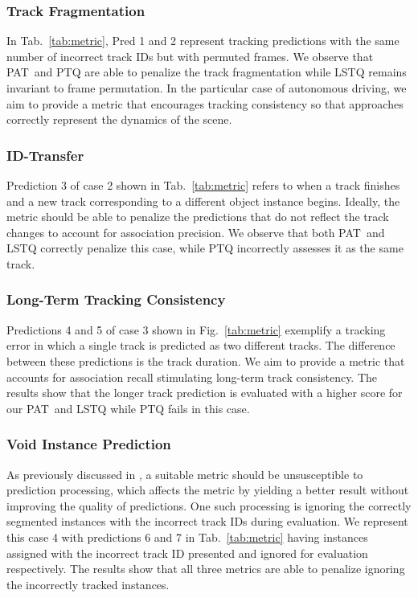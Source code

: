 \documentclass[letterpaper, 10 pt, journal, twoside]{IEEEtran}
\newcommand{\figref}[1]{Fig.~\ref{#1}}
\newcommand{\tabref}[1]{Tab.~\ref{#1}}
\newcommand{\newmet}{PAT}
\begin{document}
\subsubsection{Track Fragmentation}

In \tabref{tab:metric}, Pred 1 and 2 represent tracking predictions with the same number of incorrect track IDs but with permuted frames. We observe that \newmet~and PTQ are able to penalize the track fragmentation while LSTQ remains invariant to frame permutation. In the particular case of autonomous driving, we aim to provide a metric that encourages tracking consistency so that approaches correctly represent the dynamics of the scene.

\subsubsection{ID-Transfer}

Prediction 3 of case 2 shown in \tabref{tab:metric} refers to when a track finishes and a new track corresponding to a different object instance begins. Ideally, the metric should be able to penalize the predictions that do not reflect the track changes to account for association precision. We observe that both \newmet~and LSTQ correctly penalize this case, while PTQ incorrectly assesses it as the same track.

\subsubsection{Long-Term Tracking Consistency}

Predictions 4 and 5 of case 3 shown in \figref{tab:metric} exemplify a tracking error in which a single track is predicted as two different tracks. The difference between these predictions is the track duration. We aim to provide a metric that accounts for association recall stimulating long-term track consistency. The results show that the longer track prediction is evaluated with a higher score for our \newmet~and LSTQ while PTQ fails in this case.

\subsubsection{Void Instance Prediction}

As previously discussed in \cite{weber2021step}, a suitable metric should be unsusceptible to prediction processing, which affects the metric by yielding a better result without improving the quality of predictions. One such processing is ignoring the correctly segmented instances with the incorrect track IDs during evaluation. We represent this case 4 with predictions 6 and 7 in \tabref{tab:metric} having instances assigned with the incorrect track ID presented and ignored for evaluation respectively. The results show that all three metrics are able to penalize ignoring the incorrectly tracked instances.
\end{document}
